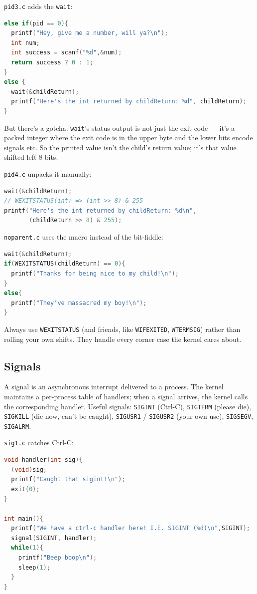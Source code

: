 \documentclass[11pt]{article}
\begin{document}
\texttt{pid3.c} adds the \texttt{wait}:

\begin{lstlisting}[language=C]
else if(pid == 0){
  printf("Hey, give me a number, will ya?\n");
  int num;
  int success = scanf("%d",&num);
  return success ? 0 : 1;
}
else {
  wait(&childReturn);
  printf("Here's the int returned by childReturn: %d", childReturn);
}
\end{lstlisting}

But there's a gotcha: \texttt{wait}'s status output is not just the
exit code --- it's a packed integer where the exit code is in the
upper byte and the lower bits encode signals etc. So the printed
value isn't the child's return value; it's that value shifted left 8
bits.

\texttt{pid4.c} unpacks it manually:

\begin{lstlisting}[language=C]
wait(&childReturn);
// WEXITSTATUS(int) => (int >> 8) & 255
printf("Here's the int returned by childReturn: %d\n",
       (childReturn >> 8) & 255);
\end{lstlisting}

\texttt{noparent.c} uses the macro instead of the bit-fiddle:

\begin{lstlisting}[language=C]
wait(&childReturn);
if(WEXITSTATUS(childReturn) == 0){
  printf("Thanks for being nice to my child!\n");
}
else{
  printf("They've massacred my boy!\n");
}
\end{lstlisting}

Always use \texttt{WEXITSTATUS} (and friends, like
\texttt{WIFEXITED}, \texttt{WTERMSIG}) rather than rolling your own
shifts. They handle every corner case the kernel cares about.

\subsection*{Signals}

A signal is an asynchronous interrupt delivered to a process. The
kernel maintains a per-process table of handlers; when a signal
arrives, the kernel calls the corresponding handler. Useful signals:
\texttt{SIGINT} (Ctrl-C), \texttt{SIGTERM} (please die),
\texttt{SIGKILL} (die now, can't be caught), \texttt{SIGUSR1} /
\texttt{SIGUSR2} (your own use), \texttt{SIGSEGV},
\texttt{SIGALRM}.

\texttt{sig1.c} catches Ctrl-C:

\begin{lstlisting}[language=C]
void handler(int sig){
  (void)sig;
  printf("Caught that sigint!\n");
  exit(0);
}

int main(){
  printf("We have a ctrl-c handler here! I.E. SIGINT (%d)\n",SIGINT);
  signal(SIGINT, handler);
  while(1){
    printf("Beep boop\n");
    sleep(1);
  }
}
\end{lstlisting}
\end{document}
